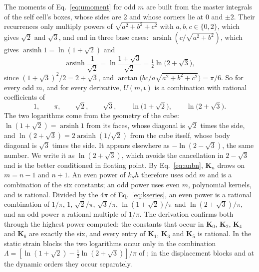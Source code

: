\documentclass[11pt,a4paper]{article}
\newcommand{\bK}{\mathbf{K}}
\newcommand{\biota}{\boldsymbol{\iota}}
\begin{document}
The moments of Eq.~\eqref{eq:umoment} for odd $m$ are built from the master integrals of the self cell's
boxes, whose sides are $2$ and whose corners lie at $0$ and $\pm2$. Their recurrences only multiply powers
of $\sqrt{a^2+b^2+c^2}$ with $a,b,c\in\{0,2\}$, which gives $\sqrt2$ and $\sqrt3$, and end in three base
cases: $\operatorname{arsinh}(c/\sqrt{a^2+b^2})$, which gives $\operatorname{arsinh}1=\ln(1+\sqrt2)$ and
\begin{equation}\label{eq:arsinh}
  \operatorname{arsinh}\frac1{\sqrt2}=\ln\frac{1+\sqrt3}{\sqrt2}=\tfrac12\ln\bigl(2+\sqrt3\bigr),
\end{equation}
since $(1+\sqrt3)^2/2=2+\sqrt3$, and $\arctan\bigl(bc/a\sqrt{a^2+b^2+c^2}\bigr)=\pi/6$. So for every
odd $m$, and for every derivative, $U(m,\biota)$ is a combination with rational coefficients of
\begin{equation}\label{eq:sixconstants}
  1,\qquad \pi,\qquad \sqrt2,\qquad \sqrt3,\qquad \ln\bigl(1+\sqrt2\bigr),\qquad \ln\bigl(2+\sqrt3\bigr).
\end{equation}
The two logarithms come from the geometry of the cube: $\ln(1+\sqrt2)=\operatorname{arsinh}1$ from its faces,
whose diagonal is $\sqrt2$ times the side, and $\ln(2+\sqrt3)=2\operatorname{arsinh}(1/\sqrt2)$ from the cube
itself, whose body diagonal is $\sqrt3$ times the side. It appears elsewhere as $-\ln(2-\sqrt3)$, the same number.
We write it as $\ln(2+\sqrt3)$, which avoids the cancellation in $2-\sqrt3$ and is the better conditioned in
floating point.
By Eq.~\eqref{eq:anbn}, $\bK_n$ draws on $m=n-1$ and $n+1$. An even power of $k_Sh$ therefore uses odd
$m$ and is a combination of the six constants; an odd power uses even $m$, polynomial kernels, and is
rational. Divided by the $4\pi$ of Eq.~\eqref{eq:kseries}, an even power is a rational combination of
$1/\pi$, $1$, $\sqrt2/\pi$, $\sqrt3/\pi$, $\ln(1+\sqrt2)/\pi$ and $\ln(2+\sqrt3)/\pi$, and an
odd power a rational multiple of $1/\pi$. The derivation confirms both through the highest power computed:
the constants that occur in $\bK_0$, $\bK_2$, $\bK_4$ and $\bK_6$ are exactly the six, and every entry of
$\bK_1$, $\bK_3$ and $\bK_5$ is rational. In the static strain blocks the two logarithms occur only in the combination
$\Lambda=[\ln(1+\sqrt2)-\tfrac12\ln(2+\sqrt3)]/\pi$ of \citet{NestorCoupling2026}; in the
displacement blocks and at the dynamic orders they occur separately.
\end{document}
